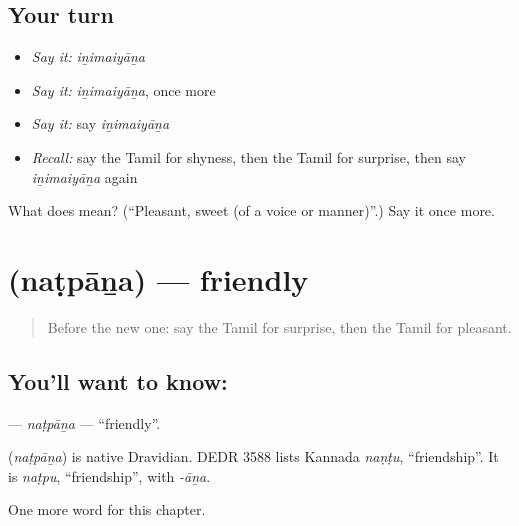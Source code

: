\subsection*{Your turn}
\begin{itemize}
\raggedright
  \item \emph{Say it:} \emph{iṉimaiyāṉa}
  \item \emph{Say it:} \emph{iṉimaiyāṉa}, once more
  \item \emph{Say it:} say \emph{iṉimaiyāṉa}
  \item \emph{Recall:} say the Tamil for shyness, then the Tamil for surprise, then say \emph{iṉimaiyāṉa} again
\end{itemize}

\begin{tcolorbox}[breakable,colback=teal!4,colframe=teal!35!black,title={Before you move on}]
What does  mean? (\textquotedblleft{}Pleasant, sweet (of a voice or manner)\textquotedblright{}.) Say it once more.
\end{tcolorbox}
\section[\texorpdfstring{\ta{நட்பான} (naṭpāṉa)}{நட்பான (naṭpāṉa)}]{ (naṭpāṉa) — friendly}

\label{lesson:TA-C211-natpana}



\begin{quote}
Before the new one: say the Tamil for surprise, then the Tamil for pleasant.
\end{quote}

\subsection*{You'll want to know: }
\textbf{} — \emph{naṭpāṉa} — \textquotedblleft{}friendly\textquotedblright{}.

\begin{cousinweb}
\textbf{} (\emph{naṭpāṉa}) is native Dravidian. DEDR 3588 lists Kannada \emph{naṇṭu}, \textquotedblleft{}friendship\textquotedblright{}. It is \emph{naṭpu}, \textquotedblleft{}friendship\textquotedblright{}, with \emph{-āṉa}.
\end{cousinweb}

\begin{grammarlens}[title={What you've built}]
One more word for this chapter.
\end{grammarlens}

